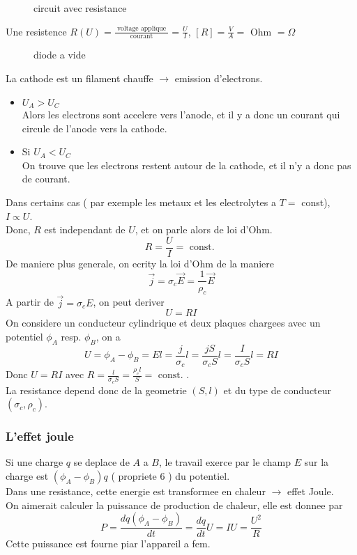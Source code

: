 \documentclass[../main.tex]{subfiles}
\begin{document}
\begin{figure}[ht]
    \centering
    \caption{circuit avec resistance}
    \label{fig:circuit-avec-resistance}
\end{figure}
Une resistence $R( U) = \frac{ \text{ voltage applique } }{ \text{ courant } }= \frac{U}{I} $, $ [ R] = \frac{V}{A}= \text{ Ohm } = \Omega$	
\begin{exemple}
\begin{figure}[ht]
    \centering
    \caption{diode a vide}
    \label{fig:diode-a-vide}
\end{figure}
La cathode est un filament chauffe $\to$ emission d'electrons.\\
\begin{itemize}
\item $U_A > U_C$ \\
	Alors les electrons sont accelere vers l'anode, et il y a donc un courant qui circule de l'anode vers la cathode.
\item Si $U_A < U_C$ \\
	On trouve que les electrons restent autour de la cathode, et il n'y a donc pas de courant.
\end{itemize}
\end{exemple}
Dans certains cas ( par exemple les metaux et les electrolytes a $T=$ const), $I \propto U$. \\
Donc, $R$ est independant de $U$, et on parle alors de loi d'Ohm.
\[ 
R= \frac{U}{I}= \text{ const. } 
\]
De maniere plus generale, on ecrity la loi d'Ohm de la maniere
\[ 
\vec{j} = \sigma_c \vec{E} = \frac{1}{\rho_c} \vec{E}
\]
A partir de $\vec{j}= \sigma_c E$, on peut deriver
\[ 
U=RI
\]
On considere un conducteur cylindrique et deux plaques chargees avec un potentiel $\phi_A$ resp. $\phi_B$, on a
\[ 
U = \phi_A - \phi_B = El = \frac{j }{\sigma_c} l = \frac{j S}{\sigma_c S}l = \frac{I}{\sigma_c S} l = RI
\]
Donc $U = RI$ avec  $ R = \frac{l}{\sigma_c S} = \frac{\rho_c l}{S}= \text{ const. } $.\\
La resistance depend donc de la geometrie $( S,l) $ et du type de conducteur $ (  \sigma_c, \rho_c) $.\\
\subsubsection{L'effet joule}
Si une charge $q$ se deplace de $A$ a $B$, le travail exerce par le champ $E$ sur la charge est $( \phi_A- \phi_B)q $ ( propriete 6 ) du potentiel.\\
Dans une resistance, cette energie est transformee en chaleur $\to $ effet Joule.\\
On aimerait calculer la puissance de production de chaleur, elle est donnee par
\[ 
	P = \frac{ dq  ( \phi_A - \phi_B) }{dt} = \frac{dq}{dt} U = IU = \frac{U ^{2}}{R}
\]
Cette puissance est fourne piar l'appareil a fem.
\end{document}
